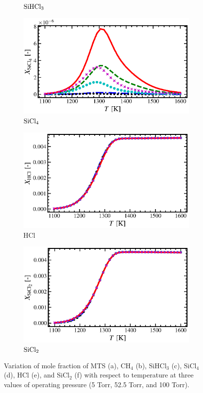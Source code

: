 \documentclass[final, letterpaper, square, comma, numbers, sort&compress]{elsarticle}
\begin{document}
\begin{figure}
\begin{subfigure}{0.49\textwidth}
        \caption{$\rm SiHCl_3$}
    \end{subfigure}
    \begin{subfigure}{0.49\textwidth}
        \centering
        \includegraphics[width=0.99\textwidth]{T-vs-SiCl4-compare}
        \caption{$\rm SiCl_4$}
    \end{subfigure}
    \begin{subfigure}{0.49\textwidth}
        \centering
        \includegraphics[width=0.99\textwidth]{T-vs-HCl-compare}
        \caption{HCl}
    \end{subfigure}
    \begin{subfigure}{0.49\textwidth}
        \centering
        \includegraphics[width=0.99\textwidth]{T-vs-SiCl2-compare}
        \caption{$\rm SiCl_2$}
    \end{subfigure}
    \caption{Variation of mole fraction of MTS (a), CH$_4$ (b), SiHCl$_3$ (c), SiCl$_4$ (d), HCl (e), and SiCl$_2$ (f) with respect to temperature at three values of operating pressure (5 Torr, 52.5 Torr, and 100 Torr).}
    \label{fig:6}
\end{figure}
\end{document}
